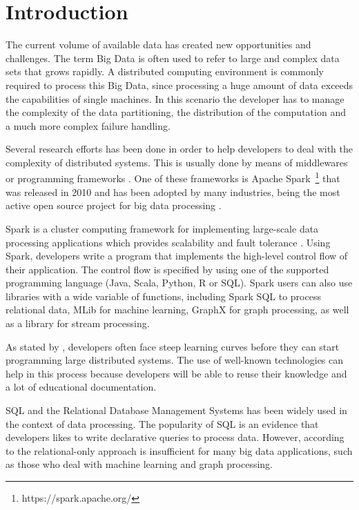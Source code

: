 \chapter{Introduction}

The current volume of available data has created new opportunities and challenges. The term Big Data is often used to refer to large and complex data sets that grows rapidly. A distributed computing environment is commonly required to process this Big Data, since processing a huge amount of data exceeds the capabilities of single machines. In this scenario the developer has to manage the complexity of the data partitioning, the distribution of the computation and a much more complex failure handling.

Several research efforts has been done in order to help developers to deal with the complexity of distributed systems. This is usually done by means of middlewares or programming frameworks \cite{ranganathan2007complexity}. One of these frameworks is Apache Spark~\footnote{https://spark.apache.org/} that was released in 2010 and has been adopted by many industries, being the most active open source project for big data processing \cite{armbrust2015sparksql}. 

Spark is a cluster computing framework for implementing large-scale data processing applications which provides scalability and fault tolerance \cite{zaharia2010spark}. Using Spark, developers write a program that implements the high-level control flow of their application. The control flow is specified by using one of the supported programming language (Java, Scala, Python, R or SQL). Spark users can also use libraries with a wide variable of functions, including Spark SQL to process relational data, MLib for  machine learning, GraphX for graph processing, as well as a library for stream processing.

As stated by \cite{ranganathan2007complexity}, developers often face steep learning curves before they can start programming large distributed systems. The use of well-known technologies can help in this process because developers will be able to reuse their knowledge and a lot of educational documentation.

SQL and the Relational Database Management Systems has been widely used in the context of data processing. The popularity of SQL is an evidence that developers likes to write declarative queries to process data. However, according to \cite{armbrust2015sparksql} the relational-only approach is insufficient for many big data applications, such as those who deal with machine learning and graph processing.

